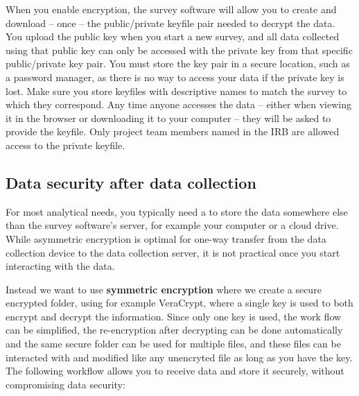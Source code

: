When you enable encryption, the survey software will allow you to create and
download -- once -- the public/private keyfile pair needed to decrypt the data. You
upload the public key when you start a new survey, and all data collected using that
public key can only be accessed with the private key from that specific public/private key
pair. You must store the key pair in a secure location, such as a password manager, as
there is no way to access your data if the private key is lost. Make sure you store
keyfiles with descriptive names to match the survey to which they correspond. Any time
anyone accesses the data -- either when viewing it in the browser or downloading it to
your computer -- they will be asked to provide the keyfile. Only project team members
named in the IRB are allowed access to the private keyfile.

\subsection{Data security after data collection}

For most analytical needs, you typically need a to store the data somewhere else
than the survey software's server, for example your computer or a cloud drive. While
asymmetric encryption is optimal for one-way transfer from the data collection device
to the data collection server, it is not practical once you start interacting with the data.

Instead we want to use \textbf{symmetric encryption} where we
create a secure encrypted folder, using for example VeraCrypt,
where a single key is used to both encrypt and decrypt the information. Since only one
key is used, the work flow can be simplified, the re-encryption after decrypting can
be done automatically and the same secure folder can be used for multiple files, and
these files can be interacted with and modified like any unencryted file as long as you
have the key. The following workflow allows you to receive data and store it securely,
without compromising data security:

